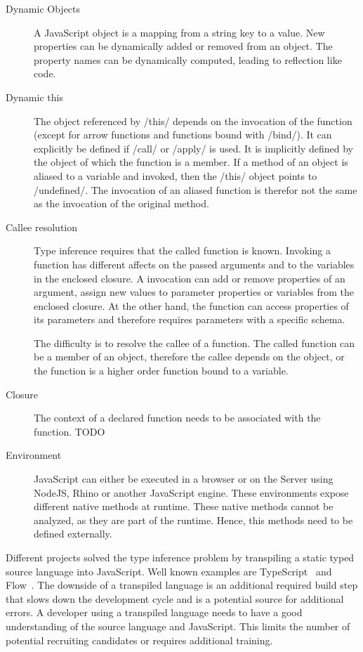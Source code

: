 \begin{description}
	\item[Dynamic Objects] A JavaScript object is a mapping from a string key to a value. New properties can be dynamically added or removed from an object. The property names can be dynamically computed, leading to reflection like code.  
	
	\item[Dynamic this] The object referenced by \javascriptinline/this/ depends on the invocation of the function (except for arrow functions and functions bound with \javascriptinline/bind/). It can explicitly be defined if \javascriptinline/call/ or \javascriptinline/apply/ is used. It is implicitly defined by the object of which the function is a member. If a method of an object is aliased to a variable and invoked, then the \javascriptinline/this/ object points to \javascriptinline/undefined/. The invocation of an aliased function is therefor not the same as the invocation of the original method.
	
	\item[Callee resolution] Type inference requires that the called function is known. Invoking a function has different affects on the passed arguments and to the variables in the enclosed closure. A invocation can add or remove properties of an argument, assign new values to parameter properties or variables from the enclosed closure. At the other hand, the function can access properties of its parameters and therefore requires parameters with a specific schema. 

The difficulty is to resolve the callee of a function. The called function can be a member of an object, therefore the callee depends on the object, or the function is a higher order function bound to a variable. 

	\item[Closure] The context of a declared function needs to be associated with the function. TODO 

	\item[Environment] JavaScript can either be executed in a browser or on the Server using NodeJS, Rhino or another JavaScript engine. These environments expose different native methods at runtime. These native methods cannot be analyzed, as they are part of the runtime. Hence, this methods need to be defined externally. 

\end{description}



Different projects solved the type inference problem by transpiling a static typed source language into JavaScript. Well known examples are TypeScript~\cite{Microsoft2012} and Flow~\cite{Facebook2014}. The downside of a transpiled language is an additional required build step that slows down the development cycle and is a potential source for additional errors. A developer using a transpiled language needs to have a good understanding of the source language and JavaScript. This limits the number of potential recruiting candidates or requires additional training.

